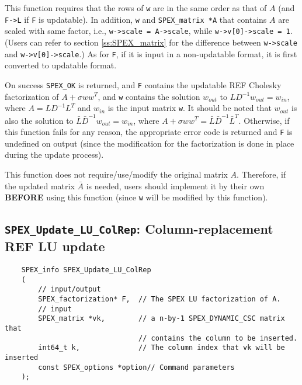 \documentclass[12pt]{report}
\theoremstyle{definition}
\begin{document}
{This function requires that the rows of \verb|w| are in the same order as that of $A$ (and \verb|F->L| if \verb|F| is updatable). In addition, \verb|w| and \verb|SPEX_matrix *A| that contains $A$ are scaled with same factor, i.e., \verb|w->scale = A->scale|, while \verb|w->v[0]->scale = 1|. (Users can refer to section \ref{ss:SPEX_matrix} for the difference between \verb|w->scale| and \verb|w->v[0]->scale|.) As for \verb|F|, if it is input in a non-updatable format, it is first converted to updatable format. 

On success \verb|SPEX_OK| is returned, and \verb|F| contains the updatable REF Cholesky factorization of $A + \sigma w w^T$, and  \verb|w| contains the solution $w_{out}$ to $LD^{-1}w_{out} = w_{in}$, where $A=LD^{-1}L^T$ and $w_{in}$ is the input matrix \verb|w|. It should be noted that $w_{out}$ is also the solution to $\bar{L}\bar{D}^{-1}w_{out} = w_{in}$, where $A+ \sigma w w^T=\bar{L}\bar{D}^{-1}\bar{L}^T$. Otherwise, if this function fails for any reason, the appropriate error code is returned and \verb|F| is undefined on output (since the modification for the factorization is done in place during the update process).


This function does not require/use/modify the original matrix $A$. Therefore, if the updated matrix $\bar{A}$ is needed, users should implement it by their own {\bf BEFORE} using this function (since \verb|w| will be modified by this function). 

\subsection{\texttt{SPEX\_Update\_LU\_ColRep}: Column-replacement REF LU update}\label{ss:SPEX_Update_LU_ColRep}


\begin{mdframed}[userdefinedwidth=6in]
{\footnotesize
\begin{verbatim}
    SPEX_info SPEX_Update_LU_ColRep
    (
        // input/output
        SPEX_factorization* F,  // The SPEX LU factorization of A.
        // input
        SPEX_matrix *vk,        // a n-by-1 SPEX_DYNAMIC_CSC matrix that
                                // contains the column to be inserted.
        int64_t k,              // The column index that vk will be inserted
        const SPEX_options *option// Command parameters
    );
\end{verbatim}
} \end{mdframed}

}
\end{document}
